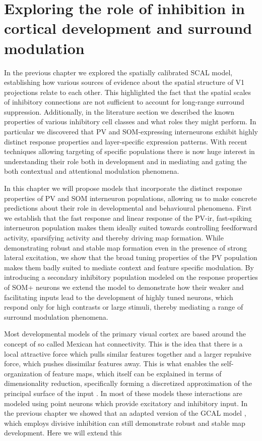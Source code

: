 \chapter{Exploring the role of inhibition in cortical development and surround modulation}

In the previous chapter we explored the spatially calibrated SCAL
model, establishing how various sources of evidence about the spatial
structure of V1 projections relate to each other. This highlighted the
fact that the spatial scales of inhibitory connections are not
sufficient to account for long-range surround
suppression. Additionally, in the literature section we
described the known properties of various inhibitory cell classes and
what roles they might perform. In particular we discovered that PV and
SOM-expressing interneurons exhibit highly distinct response
properties and layer-specific expression patterns.  With recent
techniques allowing targeting of specific populations there is now
huge interest in understanding their role both in development and in
mediating and gating the both contextual and attentional modulation
phenomena.

In this chapter we will propose models that incorporate the distinct
response properties of PV and SOM interneuron populations, allowing us
to make concrete predictions about their role in developmental and
behavioural phenomena. First we establish that the fast response and
linear response of the PV-ir, fast-spiking interneuron population
makes them ideally suited towards controlling feedforward activity,
sparsifying activity and thereby driving map formation. While
demonstrating robust and stable map formation even in the presence of
strong lateral excitation, we show that the broad tuning properties of
the PV population makes them badly suited to mediate context and
feature specific modulation. By introducing a secondary inhibitory
population modeled on the response properties of SOM+ neurons we
extend the model to demonstrate how their weaker and facilitating
inputs \citep{Bartley2008,Beierlein2003,Bartley2008,Tan2008} lead to
the development of highly tuned neurons, which respond only for high
contrasts or large stimuli, thereby mediating a range of surround
modulation phenomena.


Most developmental models of the primary visual cortex are based
around the concept of so called Mexican hat connectivity. This is the
idea that there is a local attractive force which pulls similar
features together and a larger repulsive force, which pushes
dissimilar features away. This is what enables the self-organization
of feature maps, which itself can be explained in terms of
dimensionality reduction, specifically forming a discretized
approximation of the principal surface of the input
\citep{Ritter1992}. In most of these models \citep{Miller1994,
  Miikkulainen2005} these interactions are modeled using point neurons
which provide excitatory and inhibitory input. In the previous chapter
we showed that an adapted version of the GCAL model
\citep{Stevens2013}, which employs divisive inhibition can still
demonstrate robust and stable map development. Here we will extend
this

